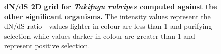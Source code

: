\documentclass{article}
\begin{document}
\begin{figure}[H]
\centering
{}
\caption{\textbf{dN/dS 2D grid for \textit{Takifugu rubripes} computed against the other significant organisms.} The intensity values represent the dN/dS ratio - values lighter in colour are less than 1 and purifying selection while values darker in colour are greater than 1 and represent positive selection.}
\label{sup_fig_33}
\end{figure}
\end{document}
